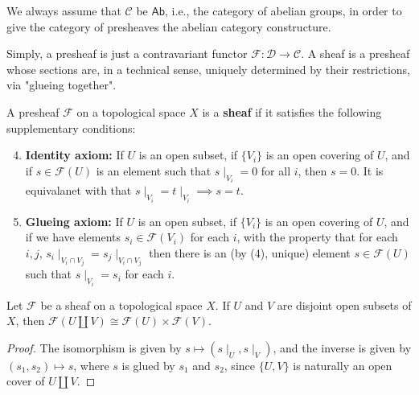 \documentclass[11pt]{article}
\begin{document}
\begin{definition}
    We always assume that $ \mathcal{C} $ be 
    $ \mathsf{Ab} $, i.e., the category of abelian groups, 
    in order to give the category of presheaves the abelian 
    category constructure. 
\end{definition}

Simply, a presheaf is just a contravariant functor 
$ \mathscr{F} : \mathcal{D} \to \mathcal{C} $. 
A sheaf is a presheaf whose sections are, 
in a technical sense, uniquely determined by their restrictions, 
via "glueing together". 

\begin{definition}
    A presheaf $\mathscr{F}$ on a topological space $X$ 
    is a \textbf{sheaf} if it satisfies the following 
    supplementary conditions:
    \begin{enumerate}[label=(\arabic*)]
        \setcounter{enumi}{3}
        \item \textbf{Identity axiom:} 
            If $U$ is an open subset, 
            if $\{V_{i}\}$ is an open covering of $U$, 
            and if $s \in \mathscr{F}(U)$ is an element such 
            that $s \mid_{V_{i}}=0$ for all $i$, 
            then $s=0$. 
            It is equivalanet with that  
            $s \mid_{V_{i}}=t\mid_{V_{i}} \implies s=t$. 

        \item \textbf{Glueing axiom:} If $U$ is an open subset, 
        if $\{V_{i}\}$ is an open covering of $U$, 
        and if we have elements $s_{i} \in \mathscr{F}(V_{i})$ 
        for each $i$, with the property that for each $i,j$, 
        $s_{i} \mid_{V_{i}\cap V_{j}}=s_{j} \mid_{V_{i}\cap V_{j}}$ 
        then there is an (by (4), unique) element 
        $s \in \mathscr{F}(U)$ such that $s \mid_{V_{i}} =s_{i}$ 
        for each $i$. 
    \end{enumerate}
\end{definition}

\begin{lemma}
    Let $ \mathscr{F} $ be a sheaf on a topological space $ X $. 
    If $ U $ and $ V $ are disjoint open subsets of $ X $, 
    then $ \mathscr{F}(U \amalg V) \cong \mathscr{F}(U) \times \mathscr{F}(V) $. 
\end{lemma}

\begin{proof}
    The isomorphism is given by $ s \mapsto (s \mid_{U}, s \mid_{V}) $, 
    and the inverse is given by $ (s_{1},s_{2}) \mapsto s$, 
    where $ s $ is glued by $ s_{1} $ and $ s_{2} $, 
    since $ \{U,V\} $ is naturally an open cover of $ U \amalg V $. 
\end{proof}
\end{document}
